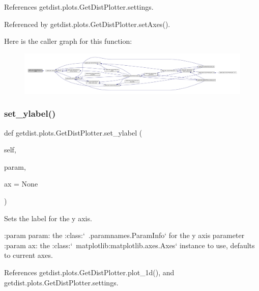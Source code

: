 References getdist.\+plots.\+Get\+Dist\+Plotter.\+settings.



Referenced by getdist.\+plots.\+Get\+Dist\+Plotter.\+set\+Axes().

Here is the caller graph for this function\+:
\nopagebreak
\begin{figure}[H]
\begin{center}
\leavevmode
\includegraphics[width=350pt]{classgetdist_1_1plots_1_1GetDistPlotter_a307e4b542216e36e71550a6d34a36f49_icgraph}
\end{center}
\end{figure}
\mbox{\label{classgetdist_1_1plots_1_1GetDistPlotter_ae83a5b69313acacabeb99940a25c1004}} 
\subsubsection{\texorpdfstring{set\+\_\+ylabel()}{set\_ylabel()}}
{\footnotesize\ttfamily def getdist.\+plots.\+Get\+Dist\+Plotter.\+set\+\_\+ylabel (\begin{DoxyParamCaption}\item[{}]{self,  }\item[{}]{param,  }\item[{}]{ax = {\ttfamily None} }\end{DoxyParamCaption})}

\begin{DoxyVerb}Sets the label for the y axis.

:param param: the :class:`~.paramnames.ParamInfo` for the y axis parameter
:param ax: the :class:`~matplotlib:matplotlib.axes.Axes` instance to use, defaults to current axes.
\end{DoxyVerb}
 

References getdist.\+plots.\+Get\+Dist\+Plotter.\+plot\+\_\+1d(), and getdist.\+plots.\+Get\+Dist\+Plotter.\+settings.



